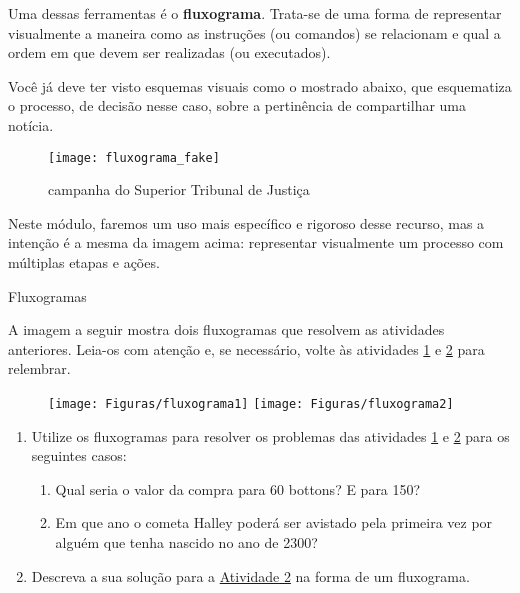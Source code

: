 Uma dessas ferramentas é o \textbf{fluxograma}. Trata-se de uma forma de representar visualmente a maneira como as instruções (ou comandos) se relacionam e qual a ordem em que devem ser realizadas (ou executados).

Você já deve ter visto esquemas visuais como o mostrado abaixo, que esquematiza o processo, de decisão nesse caso, sobre a pertinência de compartilhar uma notícia.

\begin{figure}[H]
\centering

\texttt{[image: fluxograma\_fake]}
\caption{campanha do Superior Tribunal de Justiça}
\label{}
\end{figure}

Neste módulo, faremos um uso mais específico e rigoroso desse recurso, mas a intenção é a mesma da imagem acima: representar visualmente um processo com múltiplas etapas e ações.

\clearpage
\begin{task}{Fluxogramas}
\label{comp-task3}

A imagem a seguir mostra dois fluxogramas que resolvem as atividades anteriores. Leia-os com atenção e, se necessário, volte às atividades \hyperref[comp-task1]{1} e \hyperref[comp-task2]{2} para relembrar.

\begin{figure}[H]
\centering

\texttt{[image: Figuras/fluxograma1]}
\hspace{1em}
\texttt{[image: Figuras/fluxograma2]}
\end{figure}

\begin{enumerate}
\item Utilize os fluxogramas para resolver os problemas das atividades \hyperref[comp-task1]{1} e \hyperref[comp-task2]{2} para os seguintes casos:

\begin{enumerate}
\item Qual seria o valor da compra para 60 bottons? E para 150?

\item Em que ano o cometa Halley poderá ser avistado pela primeira vez por alguém que tenha nascido no ano de 2300?
\end{enumerate}

\item Descreva a sua solução para a \hyperref[comp-task2]{Atividade 2} na forma de um fluxograma.
\end{enumerate}

\end{task}

